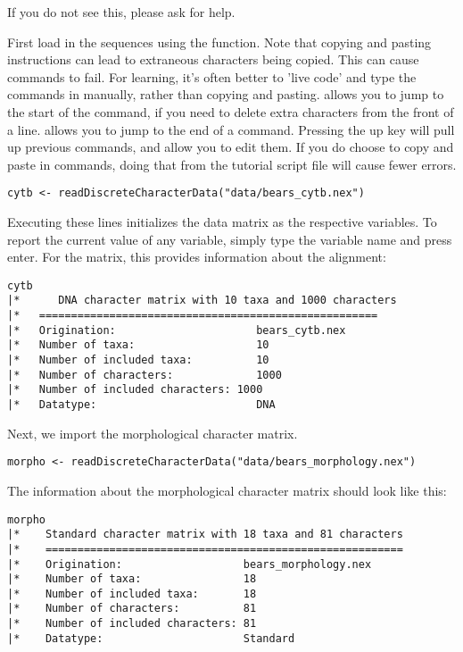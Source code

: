 If you do not see this, please ask for help.

First load in the sequences using the  function. Note that copying and pasting instructions can lead to extraneous characters being copied. This can cause commands to fail. For learning, it's often better to 'live code' and type the commands in manually, rather than copying and pasting.  allows you to jump to the start of the command, if you need to delete extra characters from the front of a line.  allows you to jump to the end of a command. Pressing the up key will pull up previous commands, and allow you to edit them. If you do choose to copy and paste in commands, doing that from the tutorial script file will cause fewer errors. 

{\tt \begin{snugshade*}
\begin{lstlisting}
cytb <- readDiscreteCharacterData("data/bears_cytb.nex") 
\end{lstlisting}
\end{snugshade*}}
Executing these lines initializes the data matrix as the respective \Rev variables. 
To report the current value of any variable, simply type the variable name and press enter. For the  matrix, this provides information about the alignment:
{\tt \begin{snugshade*}
\begin{lstlisting}
cytb
|*      DNA character matrix with 10 taxa and 1000 characters
|*   =====================================================
|*   Origination:                      bears_cytb.nex
|*   Number of taxa:                   10
|*   Number of included taxa:          10
|*   Number of characters:             1000
|*   Number of included characters: 1000
|*   Datatype:                         DNA
\end{lstlisting}
\end{snugshade*}}

Next, we import the morphological character matrix. 
{\tt \begin{snugshade*}
\begin{lstlisting}
morpho <- readDiscreteCharacterData("data/bears_morphology.nex")
\end{lstlisting}
\end{snugshade*}}

The information about the morphological character matrix should look like this:

{\tt \begin{snugshade*}
\begin{lstlisting}
morpho
|*    Standard character matrix with 18 taxa and 81 characters
|*    ========================================================
|*    Origination:                   bears_morphology.nex
|*    Number of taxa:                18
|*    Number of included taxa:       18
|*    Number of characters:          81
|*    Number of included characters: 81
|*    Datatype:                      Standard
\end{lstlisting}
\end{snugshade*}}

